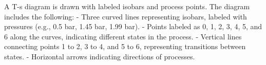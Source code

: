 A T-s diagram is drawn with labeled isobars and process points. The diagram includes the following:  
- Three curved lines representing isobars, labeled with pressures (e.g., 0.5 bar, 1.45 bar, 1.99 bar).  
- Points labeled as 0, 1, 2, 3, 4, 5, and 6 along the curves, indicating different states in the process.  
- Vertical lines connecting points 1 to 2, 3 to 4, and 5 to 6, representing transitions between states.  
- Horizontal arrows indicating directions of processes.